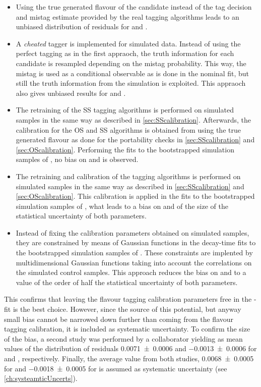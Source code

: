 \begin{itemize}
	\item Using the true generated flavour of the \B candidate instead of the tag decision and mistag estimate provided by the real tagging algorithms leads to an unbiased distribution of residuals for \Sf and \Sfbar.
	\item A \emph{cheated} tagger is implemented for simulated data.
	Instead of using the perfect tagging as in the first appraoch, the truth information for each candidate is resampled depending on the mistag probability.
	This way, the mistag is used as a conditional observable as is done in the nominal fit, but still the truth information from the simulation is exploited.
	This appraoch also gives unbiased results for \Sf and \Sfbar.
	\item The retraining of the SS tagging algorithms is performed on simulated samples in the same way as described in \cref{sec:SScalibration}.
	Afterwards, the calibration for the OS and SS algorithms is obtained from \BdToDpi using the true generated flavour as done for the portability checks in \cref{sec:SScalibration} and \cref{sec:OScalibration}.
	Performing the fits to the bootstrapped simulation samples of \BdToDpi, no bias on \Sf and \Sfbar is observed.
	\item The retraining and calibration of the tagging algorithms is performed on simulated samples in the same way as described in \cref{sec:SScalibration} and \cref{sec:OScalibration}.
	This calibration is applied in the fits to the bootstrapped simulation samples of \BdToDpi, what leads to a bias on \Sf and \Sfbar of the size of the statistical uncertainty of both parameters.
	\item Instead of fixing the calibration parameters obtained on simulated samples, they are constrained by means of Gaussian functions in the decay-time fits to the  bootstrapped simulation samples of \BdToDpi .
	These constraints are implented by multidimensional Gaussian functions taking into account the correlations on the simulated control samples.
	This approach reduces the bias on \Sf and \Sfbar to a value of the order of half the statistical uncertainty of both parameters.
\end{itemize}
This confirms that leaving the flavour tagging calibration parameters free in the \CP-fit is the best choice.
However, since the source of this potential, but anyway small bias cannot be narrowed down further than coming from the flavour tagging calibration, it is included as systematic uncertainty.
To confirm the size of the bias, a second study was performed by a collaborator yielding as mean values of the distribution of residuals \num{0.0071\pm0.0006} and \num{-0.0013\pm0.0006} for \Sf and \Sfbar, respectively.
Finally, the average value from both studies, \ie \num{0.0068\pm0.0005} for \Sf and \num{-0.0018\pm0.0005} for \Sfbar is assumed as systematic uncertainty (see \cref{ch:systeamticUncerts}).
